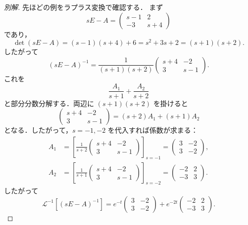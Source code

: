\documentclass[article,paper=a4paper]{jlreq}
\begin{document}
\begin{proof}[別解]
先ほどの例をラプラス変換で確認する．
まず
\[
  sE-A
    =
    \begin{pmatrix}
      s-1 & 2\\
      -3 & s+4
    \end{pmatrix}
\]
であり，
\[
  \det(sE-A)
    =(s-1)(s+4)+6
    =s^2+3s+2
    =(s+1)(s+2).
\]
したがって
\[
  (sE-A)^{-1}
    =
    \frac{1}{(s+1)(s+2)}
    \begin{pmatrix}
      s+4 & -2\\
      3 & s-1
    \end{pmatrix}.
\]
これを
\[
  \frac{A_1}{s+1}+\frac{A_2}{s+2}
\]
と部分分数分解する．両辺に $(s+1)(s+2)$ を掛けると
\[
  \begin{pmatrix}
    s+4 & -2\\
    3 & s-1
  \end{pmatrix}
    =
    (s+2)A_1+(s+1)A_2
\]
となる．したがって，$s=-1,-2$ を代入すれば係数が求まる：
\begin{align*}
  A_1
    &=
    \left[
      \frac{1}{s+2}
      \begin{pmatrix}
        s+4 & -2\\
        3 & s-1
      \end{pmatrix}
    \right]_{s=-1}
    =
    \begin{pmatrix}
      3 & -2\\
      3 & -2
    \end{pmatrix},\\
  A_2
    &=
    \left[
      \frac{1}{s+1}
      \begin{pmatrix}
        s+4 & -2\\
        3 & s-1
      \end{pmatrix}
    \right]_{s=-2}
    =
    \begin{pmatrix}
      -2 & 2\\
      -3 & 3
    \end{pmatrix}.
\end{align*}
したがって
\[
  \mathcal{L}^{-1}\!\left[(sE-A)^{-1}\right]
    =
    e^{-t}
    \begin{pmatrix}
      3 & -2\\
      3 & -2
    \end{pmatrix}
    +
    e^{-2t}
    \begin{pmatrix}
      -2 & 2\\
      -3 & 3
    \end{pmatrix}.
\]


\end{proof}
\end{document}
